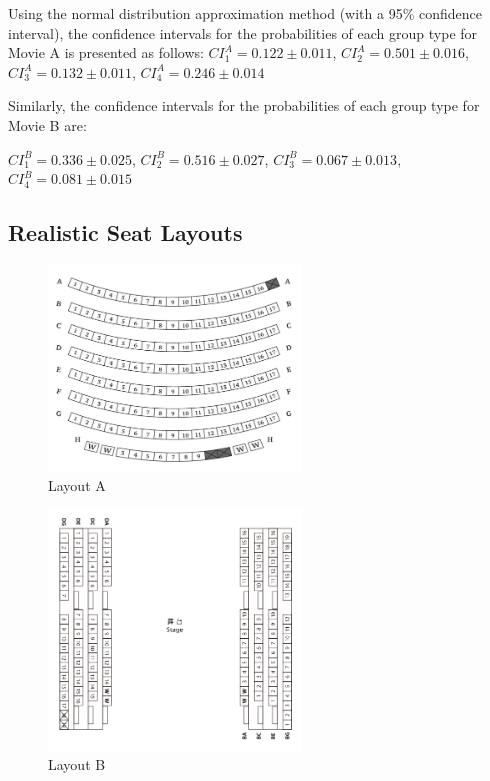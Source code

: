 Using the normal distribution approximation method (with a 95\% confidence interval), the confidence intervals for the probabilities of each group type for Movie A is presented as follows:
$CI_1^{A} =  0.122 \pm 0.011$, $CI_2^{A} =  0.501 \pm 0.016$, $CI_3^{A} = 0.132 \pm 0.011$, $CI_4^{A} = 0.246 \pm 0.014$

Similarly, the confidence intervals for the probabilities of each group type for Movie B are:

$CI_1^{B} =  0.336 \pm 0.025$, $CI_2^{B} =  0.516 \pm 0.027$, $CI_3^{B} = 0.067 \pm 0.013$, $CI_4^{B} = 0.081 \pm 0.015$




\subsection{Realistic Seat Layouts}

\begin{figure}[H]
  \caption{Layout A}
    \centering
      \includegraphics[width=0.6\textwidth]{./Figures/Layouts/Layout_A.png}
\end{figure}
  
\begin{figure}[H]
  \caption{Layout B}
    \centering
      \includegraphics[width=0.6\textwidth]{./Figures/Layouts/Layout_B.png}
\end{figure}

